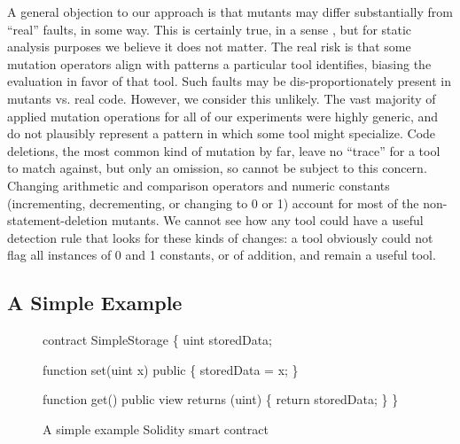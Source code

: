 A general objection to our approach is that mutants may differ substantially from ``real'' faults, in some way.  This is certainly true, in a sense \cite{GopinathMutants}, but for static analysis purposes we believe it does not matter.   The real risk is that some mutation operators align with patterns a particular tool identifies, biasing the evaluation in favor of that tool.  Such faults may be dis-proportionately present in mutants vs. real code.  However, we consider this unlikely.  The vast majority of applied mutation operations for all of our experiments were highly generic, and do not plausibly represent a pattern in which some tool might specialize.  Code deletions, the most common kind of mutation by far, leave no ``trace'' for a tool to match against, but only an omission, so cannot be subject to this concern.  Changing arithmetic and comparison operators and numeric constants (incrementing, decrementing, or changing to 0 or 1) account for most of the non-statement-deletion mutants.  We cannot see how any tool could have a useful detection rule that looks for these kinds of changes: a tool obviously could not flag all instances of 0 and 1 constants, or of addition, and remain a useful tool. 

\subsection{A Simple Example}

\begin{figure}
{\scriptsize
\begin{code}
contract SimpleStorage \{
    uint storedData;

    function set(uint x) public \{
        storedData = x;
    \}

    function get() public view returns (uint) \{
        return storedData;
    \}
  \}
\end{code}
}
\caption{A simple example Solidity smart contract}
\label{fig:sol424intro}
\end{figure}

